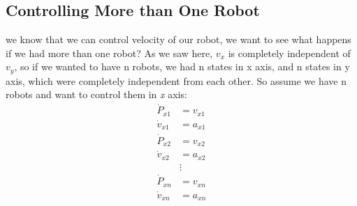\documentclass[10pt,letterpaper]{article}
\begin{document}
\subsection{Controlling More than One Robot}
we know that we can control velocity of our robot, we want to see what happens if we had more than one robot? As we saw here, $v_x$ is completely independent of $v_y$, so if we wanted to have n robots, we had n states in x axis, and n states in y axis, which were completely independent from each other. So assume we have n robots and want to control them in \emph{x} axis:\\
\begin{align}
\dot{P}_{x1} &= v_{x1}\\
\dot{v}_{x1} &= a_{x1}\\
\dot{P}_{x2} &= v_{x2}\\
\dot{v}_{x2} &= a_{x2}\\
&\vdots\\
\dot{P}_{xn} &= v_{xn}\\
\dot{v}_{xn} &= a_{xn}
\end{align}
\end{document}
